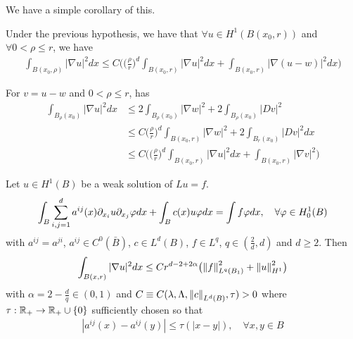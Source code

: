 \documentclass[12pt,a4paper]{article}
\newenvironment{proof}
{\begin{changemargin}{0.5cm}{0.5cm} 
	}%
	{\end{changemargin}
}
\newenvironment{p}
{\begin{proof} 
	}%
	{\end{proof}
}
\begin{document}
We have a simple corollary of this.
\s

\corr Under the previous hypothesis, we have that $\forall u\in H^1(B(x_0, r))$ and $\forall  0< \rho \leq r$, we have
\begin{align*}
\int_{B(x_0, \rho)} |\nabla u|^2 dx \leq C \Big( \big( \frac{\rho}{r}\big)^d \int_{B(x_0, r)} |\nabla u|^2 dx + \int_{B(x_0, r)} |\nabla(u-w)|^2 dx \Big)
\end{align*}
\begin{p}
\pf For $v = u-w$ and $0< \rho \leq r$, has
\begin{align*}
\int_{B_{\rho}(x_0)} |\nabla u|^2 dx & \leq 2\int_{B_{\rho}(x_0)} |\nabla w|^2 + 2 \int_{B_{\rho}(x_0)} |Dv|^2 \\
& \leq C \big( \frac{\rho}{r} \big)^d \int_{B(x_0,r)} |\nabla w|^2 + 2\int_{B_r(x_0)} |Dv|^2 dx \\
& \leq C\Big( \big( \frac{\rho}{r} \big)^d \int_{B(x_0, r)} |\nabla u|^2dx + \int_{B(x_0, r)} |\nabla v|^2 \Big)  
\end{align*}
\eop
\end{p}
\s

\thm Let $u\in H^1(B)$ be a weak solution of $Lu=f$.
\begin{align*}
\int_{B} \sum_{i,j=1}^d a^{ij}(x) \partial_{x_i} u \partial_{x_j} \varphi dx + \int_B c(x) u\varphi dx =\int f\varphi dx, \quad \forall \varphi \in H_0^1 (B)
\end{align*}
with $a^{ij} = a^{ji}$, $a^{ij} \in C^0(\bar{B})$, $c\in L^d (B)$, $f\in L^q$, $q\in (\frac{2}{d}, d)$ and $d\geq 2$. Then
\begin{align*}
\int_{B(x,r)} |\nabla u|^2 dx \leq Cr^{d-2 + 2\alpha}\big( \snorms{f}{L^q(B_1)}^2 + \snorms{u}{H^1}^2 \big)
\end{align*}
with $\alpha = 2- \frac{d}{q} \in (0,1)$ and $C \equiv C(\lambda, \Lambda, \snorms{c}{L^d(B)}, \tau) >0$ where $\tau :\mathbb{R}_+ \rightarrow \mathbb{R}_+ \cup \{0\}$ sufficiently chosen so that
\begin{align*}
|a^{ij}(x) - a^{ij}(y)| \leq \tau(|x-y|), \quad \forall x,y\in B
\end{align*} 
\eos
\s
\end{document}

